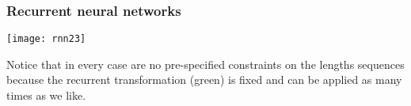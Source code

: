 \begin{frame}[fragile] \frametitle{Recurrent neural networks}
\begin{center}
\texttt{[image: rnn23]}
\end{center}
Notice that in every case are no pre-specified constraints on the lengths sequences because the recurrent transformation (green) is fixed and can be applied as many times as we like.
\end{frame}

















